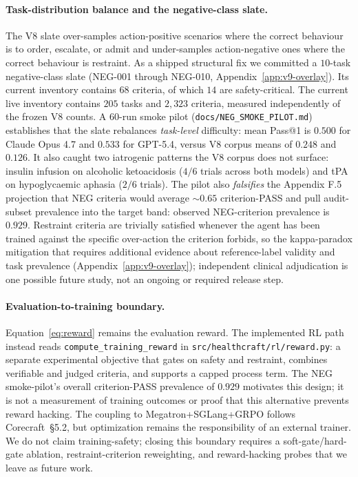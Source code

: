 \paragraph{Task-distribution balance and the negative-class slate.}
The V8 slate over-samples action-positive scenarios where
the correct behaviour is to order, escalate, or admit and
under-samples action-negative ones where the correct
behaviour is restraint. As a shipped structural fix we
committed a $10$-task %
negative-class slate (NEG-001 through NEG-010,
Appendix~\ref{app:v9-overlay}). Its current inventory contains $68$ criteria, %
of which $14$ are safety-critical. %
The current live inventory contains $205$ tasks %
and $2{,}323$ criteria, measured independently of the frozen V8 counts. %
A 60-run smoke pilot (\texttt{docs/NEG\_SMOKE\_PILOT.md})
establishes that the slate rebalances \emph{task-level}
difficulty: mean Pass@1 is $0.500$ %
for Claude Opus 4.7 and $0.533$ %
for GPT-5.4, versus V8 corpus means of $0.248$ and $0.126$.
It also caught two iatrogenic patterns the V8 corpus does
not surface: insulin infusion on alcoholic ketoacidosis
($4/6$ trials across both models) %
and tPA on hypoglycaemic aphasia
($2/6$ trials). %
The pilot also \emph{falsifies} the Appendix F.5 projection
that NEG criteria would average ${\sim}0.65$ criterion-PASS
and pull audit-subset prevalence into the target band:
observed NEG-criterion prevalence is $0.929$. %
Restraint criteria are trivially satisfied whenever the
agent has been trained against the specific over-action the
criterion forbids, so the kappa-paradox mitigation that
requires additional evidence about reference-label validity and task
prevalence (Appendix~\ref{app:v9-overlay}); independent clinical adjudication
is one possible future study, not an ongoing or required release step.

\paragraph{Evaluation-to-training boundary.}
Equation~\ref{eq:reward} remains the evaluation reward. The implemented
RL path instead reads \texttt{compute\_training\_reward} in
\texttt{src/healthcraft/rl/reward.py}: a separate experimental objective
that gates on safety and restraint, combines verifiable and judged
criteria, and supports a capped process term. The NEG smoke-pilot's
overall criterion-PASS prevalence of $0.929$ %
motivates this design; it is not a measurement of training outcomes or
proof that this alternative prevents reward hacking. The coupling to
Megatron+SGLang+GRPO follows Corecraft~\S5.2, but optimization remains
the responsibility of an external trainer. We do not claim
training-safety; closing this
boundary requires a soft-gate/hard-gate ablation, restraint-criterion
reweighting, and reward-hacking probes that we leave as future work.

